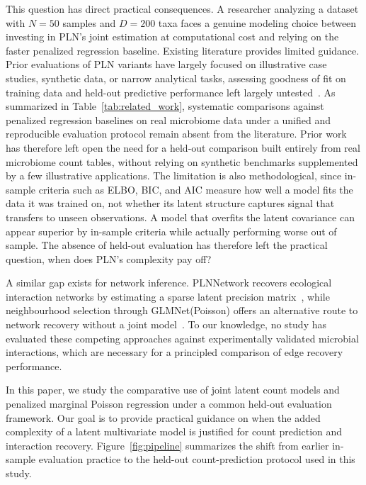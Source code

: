 \documentclass[USenglish]{article}
\theoremstyle{dgthm}
\begin{document}
This question has direct practical consequences.
A researcher analyzing a dataset with $N = 50$ samples and $D = 200$ taxa faces a genuine modeling choice between investing in PLN's joint estimation at computational cost and relying on the faster penalized regression baseline.
Existing literature provides limited guidance.
Prior evaluations of PLN variants have largely focused on illustrative case studies, synthetic data, or narrow analytical tasks, assessing goodness of fit on training data and held-out predictive performance left largely untested~\citep{Chiquet2021, Batardiere2025ZIPLN, Chaussard2025PLNTree}.
As summarized in Table~\ref{tab:related_work}, systematic comparisons against penalized regression baselines on real microbiome data under a unified and reproducible evaluation protocol remain absent from the literature.
Prior work has therefore left open the need for a held-out comparison built entirely from real microbiome count tables, without relying on synthetic benchmarks supplemented by a few illustrative applications.
The limitation is also methodological, since in-sample criteria such as ELBO, BIC, and AIC measure how well a model fits the data it was trained on, not whether its latent structure captures signal that transfers to unseen observations.
A model that overfits the latent covariance can appear superior by in-sample criteria while actually performing worse out of sample.
The absence of held-out evaluation has therefore left the practical question, when does PLN's complexity pay off?

A similar gap exists for network inference.
PLNNetwork recovers ecological interaction networks by estimating a sparse latent precision matrix~\citep{chiquet2019variational}, while neighbourhood selection through GLMNet(Poisson) offers an alternative route to network recovery without a joint model~\citep{Meinshausen2006, Friedman2010}.
To our knowledge, no study has evaluated these competing approaches against experimentally validated microbial interactions, which are necessary for a principled comparison of edge recovery performance.

In this paper, we study the comparative use of joint latent count models and penalized marginal Poisson regression under a common held-out evaluation framework.
Our goal is to provide practical guidance on when the added complexity of a latent multivariate model is justified for count prediction and interaction recovery.
Figure~\ref{fig:pipeline} summarizes the shift from earlier in-sample evaluation practice to the held-out count-prediction protocol used in this study.
\end{document}

